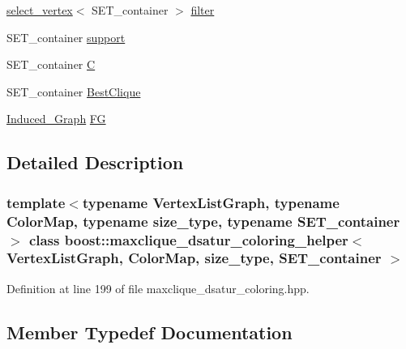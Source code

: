 \begin{DoxyCompactItemize}
\item 
\hyperlink{structboost_1_1select__vertex}{select\+\_\+vertex}$<$ S\+E\+T\+\_\+container $>$ \hyperlink{classboost_1_1maxclique__dsatur__coloring__helper_a2e3327e697fcd36678ffa1f5ab6617a1}{filter}
\item 
S\+E\+T\+\_\+container \hyperlink{classboost_1_1maxclique__dsatur__coloring__helper_afb8bc7c39aeb0b0437ca58228b6b7cae}{support}
\item 
S\+E\+T\+\_\+container \hyperlink{classboost_1_1maxclique__dsatur__coloring__helper_a251992998e0a300e73e674d0ae0fb9cd}{C}
\item 
S\+E\+T\+\_\+container \hyperlink{classboost_1_1maxclique__dsatur__coloring__helper_ac0169f40ec490dbab8d0367919afd49c}{Best\+Clique}
\item 
\hyperlink{classboost_1_1maxclique__dsatur__coloring__helper_a2928978558b9545fe58e467dd8adf0e5}{Induced\+\_\+\+Graph} \hyperlink{classboost_1_1maxclique__dsatur__coloring__helper_a96fe10b4473546d759458fe7f3bbd67f}{FG}
\end{DoxyCompactItemize}


\subsection{Detailed Description}
\subsubsection*{template$<$typename Vertex\+List\+Graph, typename Color\+Map, typename size\+\_\+type, typename S\+E\+T\+\_\+container$>$\newline
class boost\+::maxclique\+\_\+dsatur\+\_\+coloring\+\_\+helper$<$ Vertex\+List\+Graph, Color\+Map, size\+\_\+type, S\+E\+T\+\_\+container $>$}



Definition at line 199 of file maxclique\+\_\+dsatur\+\_\+coloring.\+hpp.



\subsection{Member Typedef Documentation}
\mbox{\label{classboost_1_1maxclique__dsatur__coloring__helper_a6f1b584e178237affdd69676e51eb316}} 
